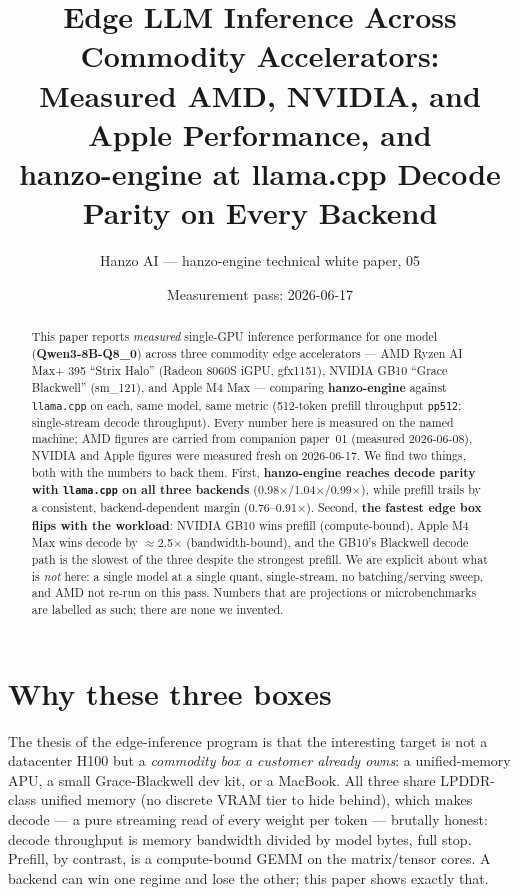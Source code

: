 \documentclass[11pt]{article}
\title{\textbf{Edge LLM Inference Across Commodity Accelerators:\\
Measured AMD, NVIDIA, and Apple Performance, and\\
hanzo-engine at llama.cpp Decode Parity on Every Backend}}
\author{Hanzo AI --- hanzo-engine technical white paper, 05}
\date{Measurement pass: 2026-06-17}
\begin{document}
\maketitle

\begin{abstract}
This paper reports \emph{measured} single-GPU inference performance for one model
(\textbf{Qwen3-8B-Q8\_0}) across three commodity edge accelerators --- AMD Ryzen AI Max+ 395
``Strix Halo'' (Radeon 8060S iGPU, gfx1151), NVIDIA GB10 ``Grace Blackwell'' (sm\_121), and
Apple M4 Max --- comparing \textbf{hanzo-engine} against \texttt{llama.cpp} on each, same model,
same metric (512-token prefill throughput \texttt{pp512}; single-stream decode throughput).
Every number here is measured on the named machine; AMD figures are carried from companion
paper~01 (measured 2026-06-08), NVIDIA and Apple figures were measured fresh on 2026-06-17.
We find two things, both with the numbers to back them. First, \textbf{hanzo-engine reaches
decode parity with \texttt{llama.cpp} on all three backends} (0.98$\times$/1.04$\times$/0.99$\times$),
while prefill trails by a consistent, backend-dependent margin (0.76--0.91$\times$). Second,
\textbf{the fastest edge box flips with the workload}: NVIDIA GB10 wins prefill (compute-bound),
Apple M4 Max wins decode by $\approx$2.5$\times$ (bandwidth-bound), and the GB10's Blackwell
decode path is the slowest of the three despite the strongest prefill. We are explicit about
what is \emph{not} here: a single model at a single quant, single-stream, no batching/serving
sweep, and AMD not re-run on this pass. Numbers that are projections or microbenchmarks are
labelled as such; there are none we invented.
\end{abstract}

\section{Why these three boxes}
The thesis of the edge-inference program is that the interesting target is not a datacenter
H100 but a \emph{commodity box a customer already owns}: a unified-memory APU, a small
Grace-Blackwell dev kit, or a MacBook. All three share LPDDR-class unified memory (no discrete
VRAM tier to hide behind), which makes decode --- a pure streaming read of every weight per
token --- brutally honest: decode throughput is memory bandwidth divided by model bytes, full
stop. Prefill, by contrast, is a compute-bound GEMM on the matrix/tensor cores. A backend can
win one regime and lose the other; this paper shows exactly that.
\end{document}
